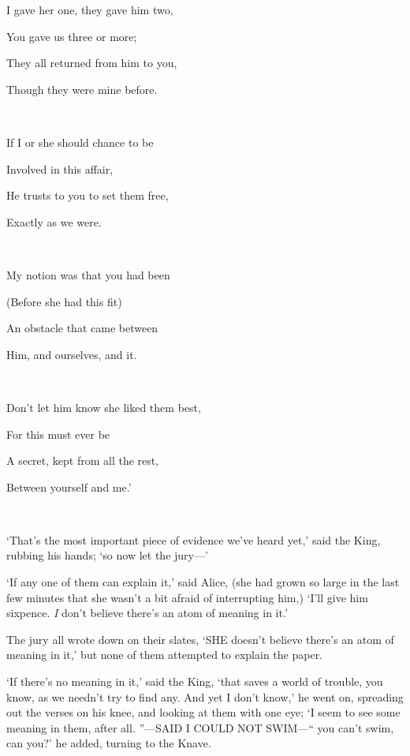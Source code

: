 \documentclass[12pt]{book}
\begin{document}
\begin{Parallel}[p]{}{}
{{\setlength{\parskip}{0em}
\par\quad I gave her one, they gave him two,
\par\quad\quad You gave us three or more;
\par\quad They all returned from him to you,
\par\quad\quad Though they were mine before.
}\\
\par

{\setlength{\parskip}{0em}
\par\quad If I or she should chance to be
\par\quad\quad Involved in this affair,
\par\quad He trusts to you to set them free,
\par\quad\quad Exactly as we were.
}\\
\par

{\setlength{\parskip}{0em}
\par\quad My notion was that you had been
\par\quad\quad (Before she had this fit)
\par\quad An obstacle that came between
\par\quad\quad Him, and ourselves, and it.
}\\
\par

{\setlength{\parskip}{0em}
\par\quad Don’t let him know she liked them best,
\par\quad\quad For this must ever be
\par\quad A secret, kept from all the rest,
\par\quad\quad Between yourself and me.’
}\\
\par

‘That’s the most important piece of evidence we’ve heard yet,’ said the King, rubbing his hands; ‘so now let the jury—’

‘If any one of them can explain it,’ said Alice, (she had grown so large in the last few minutes that she wasn’t a bit afraid of interrupting him,) ‘I’ll give him sixpence. \textit{I} don’t believe there’s an atom of meaning in it.’

The jury all wrote down on their slates, ‘SHE doesn’t believe there’s an atom of meaning in it,’ but none of them attempted to explain the paper.

‘If there’s no meaning in it,’ said the King, ‘that saves a world of trouble, you know, as we needn’t try to find any. And yet I don’t know,’ he went on, spreading out the verses on his knee, and looking at them with one eye; ‘I seem to see some meaning in them, after all. ”—SAID I COULD NOT SWIM—“ you can’t swim, can you?’ he added, turning to the Knave.

}
\end{Parallel}
\end{document}
